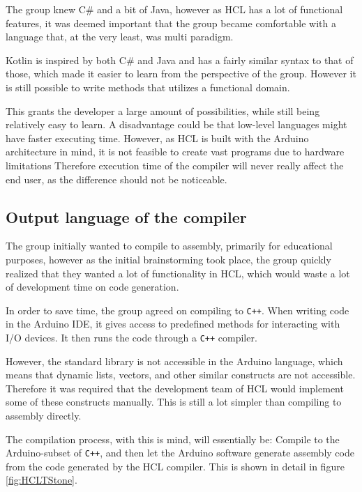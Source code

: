 The group knew C\# and a bit of Java, however as HCL has a lot of functional features, it was deemed important that the group became comfortable with a language that, at the very least, was multi paradigm.

Kotlin is inspired by both C\# and Java and has a fairly similar syntax to that of those, which made it easier to learn from the perspective of the group.
However it is still possible to write methods that utilizes a functional domain.

This grants the developer a large amount of possibilities, while still being relatively easy to learn.
A disadvantage could be that low-level languages might have faster executing time. 
However, as HCL is built with the Arduino architecture in mind, it is not feasible to create vast programs due to hardware limitations
Therefore execution time of the compiler will never really affect the end user, as the difference should not be noticeable.

\subsection{Output language of the compiler}
The group initially wanted to compile to assembly, primarily for educational purposes, however as the initial brainstorming took place, the group quickly realized that they wanted a lot of functionality in HCL, which would waste a lot of development time on code generation.

In order to save time, the group agreed on compiling to \texttt{C++}.
When writing code in the Arduino IDE, it gives access to predefined methods for interacting with I/O devices.
It then runs the code through a \texttt{C++} compiler\cite{ArFAQ}.

However, the standard library is not accessible in the Arduino language, which means that dynamic lists, vectors, and other similar constructs are not accessible.
Therefore it was required that the development team of HCL would implement some of these constructs manually.
This is still a lot simpler than compiling to assembly directly. 

The compilation process, with this is mind, will essentially be: Compile to the Arduino-subset of \texttt{C++}, and then let the Arduino software generate assembly code from the code generated by the HCL compiler.
This is shown in detail in figure \ref{fig:HCLTStone}.

